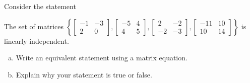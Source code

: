 
\begin{exerciseStatement}


Consider the statement 
\begin{center}\begin{minipage}{0.8\textwidth}
 The set of matrices \( \left\{ \left[\begin{array}{cc}
-1 & -3 \\
2 & 0
\end{array}\right] , \left[\begin{array}{cc}
-5 & 4 \\
4 & 5
\end{array}\right] , \left[\begin{array}{cc}
2 & -2 \\
-2 & -3
\end{array}\right] , \left[\begin{array}{cc}
-11 & 10 \\
10 & 14
\end{array}\right] \right\} \) is linearly independent.
\end{minipage}\end{center}
    


\begin{enumerate}[(a)]
\item  Write an equivalent statement using a matrix equation.
\item  Explain why your statement is true or false.
\end{enumerate}
    
\end{exerciseStatement}
    
